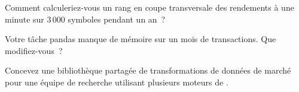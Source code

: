 \begin{interviewq}\label{iq:pl:dataframes:3}
Comment calculeriez-vous un rang en coupe transversale des rendements à une minute sur 3\,000 symboles pendant un an~?
\end{interviewq}

\begin{interviewq}\label{iq:pl:dataframes:4}
Votre tâche pandas manque de mémoire sur un mois de transactions. Que modifiez-vous~?
\end{interviewq}

\begin{interviewq}\label{iq:pl:dataframes:5}
Concevez une bibliothèque partagée de transformations de données de marché pour une équipe de recherche utilisant plusieurs moteurs de .
\end{interviewq}

